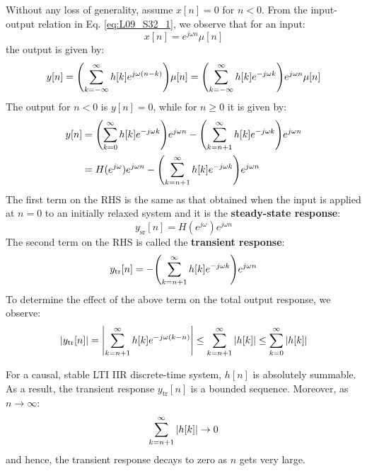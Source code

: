 \documentclass[../../main/main.tex]{subfiles}
\begin{document}
Without any loss of generality, assume \( x[n] = 0 \) for \( n < 0 \). From the input-output relation in Eq. \ref{eq:L09_S32_1}, we observe that for an input:
\begin{equation}
    x[n]
    =
    e^{j \omega n} \mu[n]
    \label{eq:L09_S49_2}
\end{equation}
the output is given by:
\begin{equation}
    y[n]
    =
    \qty(\sum_{k=-\infty}^{\infty} h[k] e^{j \omega (n-k)}) \mu[n]
    =
    \qty(\sum_{k=-\infty}^{\infty} h[k] e^{-j \omega k}) e^{j \omega n} \mu[n]
    \label{eq:L09_S49_3}
\end{equation}
The output for \( n < 0 \) is \( y[n] = 0 \), while for \( n \ge 0 \) it is given by:
\begin{align}
    y[n]
    &=
        \qty(\sum_{k=0}^{\infty} h[k] e^{-j \omega k}) e^{j \omega n} - \qty(\sum_{k=n+1}^{\infty} h[k] e^{-j \omega k}) e^{j \omega n} \nonumber   \\
    &=
        H(e^{j \omega}) e^{j \omega n} - \qty(\sum_{k=n+1}^{\infty} h[k] e^{-j \omega k}) e^{j \omega n}
\end{align}
The first term on the RHS is the same as that obtained when the input is applied at \( n = 0 \) to an initially relaxed system and it is the \textbf{steady-state response}:
\begin{equation}
    y_{\mathrm{sr}}[n]
    =
    H(e^{j \omega}) e^{j \omega n}
    \label{eq:L09_S51_2}
\end{equation}
The second term on the RHS is called the \textbf{transient response}:
\begin{equation}
    y_{\mathrm{tr}}[n]
    =
    - \qty(\sum_{k=n+1}^{\infty} h[k] e^{-j \omega k}) e^{j \omega n}
    \label{eq:L09_S52_1}
\end{equation}
To determine the effect of the above term on the total output response, we observe:
\begin{equation}
    \abs{y_{\mathrm{tr}}[n]}
    =
    \abs{\sum_{k=n+1}^{\infty} h[k] e^{-j \omega (k-n)}}
    \le
    \sum_{k=n+1}^{\infty} \abs{h[k]}
    \le
    \sum_{k=0}^{\infty} \abs{h[k]}
    \label{eq:L09_S52_2}
\end{equation}

For a causal, stable LTI IIR discrete-time system, \( h[n] \) is absolutely summable. As a result, the transient response \( y_{\mathrm{tr}}[n] \) is a bounded sequence. Moreover, as \( n \to \infty \):
\begin{equation}
    \sum_{k=n+1}^{\infty} \abs{h[k]}
    \to
    0
    \label{eq:L09_S53_1}
\end{equation}
and hence, the transient response decays to zero as \( n \) gets very large.
\end{document}
